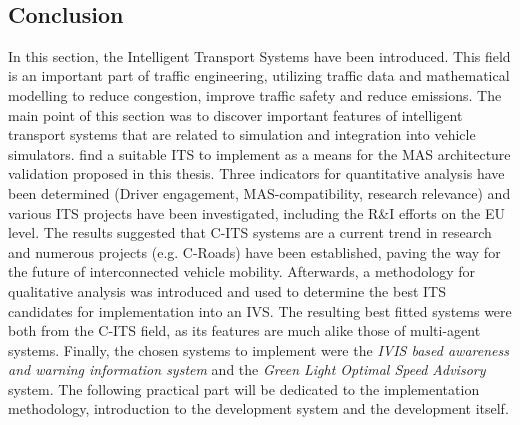 \documentclass[main.tex]{subfiles}
\begin{document}
\



\subsection{Conclusion}

In this section, the Intelligent Transport Systems have been introduced. This field is an
important part of traffic engineering, utilizing traffic data and mathematical modelling to
reduce congestion, improve traffic safety and reduce emissions. The main point of this section
was to discover important features of intelligent transport systems that are related to 
simulation and integration into vehicle simulators. 
find a suitable ITS to implement as a means for the MAS architecture validation 
proposed in this thesis. Three indicators for
quantitative analysis have been determined (Driver engagement, MAS-compatibility, research
relevance) and various ITS projects have been investigated, including the R\&I efforts on the
EU level. The results suggested that C-ITS systems are a current trend in research and numerous
projects (e.g. C-Roads) have been established, paving the way for the future of interconnected
vehicle mobility. Afterwards, a methodology for qualitative analysis was introduced and used to
determine the best ITS candidates for implementation into an IVS. The resulting best fitted
systems were both from the C-ITS field, as its features are much alike those of multi-agent
systems. Finally, the chosen systems to implement were the \emph{IVIS based awareness and
warning information system} and the \emph{Green Light Optimal Speed Advisory} system. The
following practical part will be dedicated to the implementation methodology, introduction to
the development system and the development itself.
\clearpage
\end{document}
